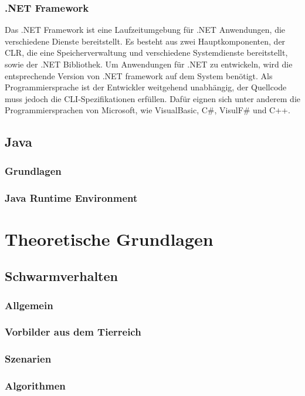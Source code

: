 \subsubsection{.NET Framework}

Das .NET Framework ist eine Laufzeitumgebung für .NET Anwendungen, die verschiedene Dienste bereitstellt. Es besteht aus zwei Hauptkomponenten, der CLR, die eine Speicherverwaltung und verschiedene Systemdienste bereitstellt, sowie der .NET Bibliothek. Um Anwendungen für .NET zu entwickeln, wird die entsprechende Version von .NET \gls{framework} auf dem System benötigt. Als Programmiersprache ist der Entwickler weitgehend unabhängig, der Quellcode muss jedoch die CLI-Spezifikationen erfüllen. Dafür eignen sich unter anderem die Programmiersprachen von Microsoft, wie VisualBasic, C\#, VisulF\# und C++.

\subsection{Java} %

\subsubsection{Grundlagen}
\subsubsection{Java Runtime Environment}

\section{Theoretische Grundlagen}

\subsection{Schwarmverhalten}
\subsubsection{Allgemein}
\subsubsection{Vorbilder aus dem Tierreich}
\subsubsection{Szenarien}
\subsubsection{Algorithmen}

